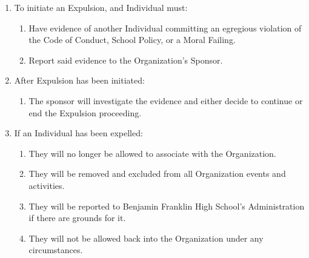 \begin{enumerate}
	\item To initiate an Expulsion, and Individual must:
		\begin{enumerate}
			\item Have evidence of another Individual committing an egregious violation
				of the Code of Conduct, School Policy, or a Moral Failing.

			\item Report said evidence to the Organization's Sponsor.
		\end{enumerate}

	\item After Expulsion has been initiated:
		\begin{enumerate}
			\item The sponsor will investigate the evidence and either decide to continue
				or end the Expulsion proceeding.
		\end{enumerate}

	\item If an Individual has been expelled:
		\begin{enumerate}
			\item They will no longer be allowed to associate with the Organization.

			\item They will be removed and excluded from all Organization events and activities.

			\item They will be reported to Benjamin Franklin High School’s Administration
				if there are grounds for it.

			\item They will not be allowed back into the Organization under any circumstances.
		\end{enumerate}
\end{enumerate}
